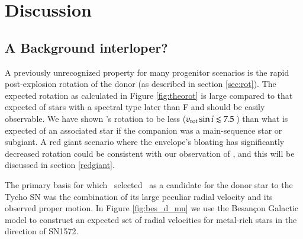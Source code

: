 \section{Discussion}


\subsection{A Background interloper?}
A previously unrecognized property for many progenitor scenarios is the rapid post-explosion rotation of the donor (as described in section \ref{sec:rot}).
The expected rotation as calculated in Figure \ref{fig:theorot} is
large compared to that expected of stars with a spectral type later
than F and should be easily observable. We have shown \starg's rotation to be less ($v_{\rm rot} \sin{i} \lesssim 7.5 $\,\kms) than what is expected  of an associated star if the companion was a main-sequence star or subgiant. A red giant scenario where the envelope's bloating has significantly decreased rotation could be consistent with our observation of \starg, and this will be discussed in section \ref{redgiant}.

The primary basis for which \rl\ selected \starg\ as a candidate for
the donor star to the Tycho SN was the combination of its large peculiar radial velocity
and its observed proper motion. In Figure \ref{fig:bes_d_mu} we
use the Besan\c{c}on Galactic model \citep{2003A&A...409..523R} to
construct an expected set of radial velocities for metal-rich stars in the
direction of SN1572.

